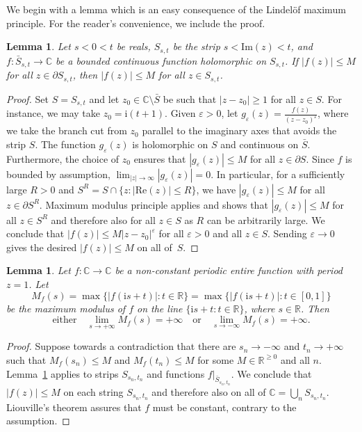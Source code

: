 \documentclass[12pt]{paper}
\numberwithin{equation}{section}
\theoremstyle{plain}
\newtheorem{lemma}[theorem]{Lemma}
\theoremstyle{definition}
\newcommand{\C}{\mathbb{C}}
\newcommand{\R}{\mathbb{R}}
\newcommand{\im}{\mathrm{i}} %
\renewcommand{\Im}{\mathrm{Im}}
\renewcommand{\Re}{\mathrm{Re}}
\renewcommand{\epsilon}{\varepsilon}
\begin{document}
We begin with a lemma which is an easy consequence of the Lindelöf maximum principle.  For the
reader's convenience, we include the proof.

\begin{lemma}
  \label{lem:maximum-principle-strip}
  Let \(s < 0 < t\) be reals, \(S_{s,t}\) be the strip \(s < \Im(z) < t\), and
  \(f : \bar{S}_{s,t} \to \C\) be a bounded continuous function holomorphic on \(S_{s,t}\).  If
  \(|f(z)| \le M\) for all \(z \in \partial S_{s,t}\), then \(|f(z)| \le M\) for all
  \(z \in S_{s,t}\).
\end{lemma}

\begin{proof}
  Set \(S = S_{s,t}\) and let \(z_{0} \in \C \setminus \bar{S}\) be such that \(|z-z_{0}| \ge 1\)
  for all \(z \in S\).  For instance, we may take \(z_{0} = \im(t + 1)\).  Given \(\epsilon > 0\),
  let \(g_{\epsilon}(z) = \frac{f(z)}{(z-z_{0})^{\epsilon}}\), where we take the branch cut from
  \(z_{0}\) parallel to the imaginary axes that avoids the strip \(S\).  The function
  \(g_{\epsilon}(z)\) is holomorphic on \(S\) and continuous on \(\bar{S}\).  Furthermore, the
  choice of \(z_{0}\) ensures that \(|g_{\epsilon}(z)| \le M\) for all \(z \in \partial S\).  Since
  \(f\) is bounded by assumption, \(\lim_{|z| \to \infty}|g_{\epsilon}(z)| = 0\).  In particular,
  for a sufficiently large \(R > 0\) and \(S^{R} = S \cap \{z : |\Re(z)| \le R\}\), we have
  \(|g_{\epsilon}(z)| \le M\) for all \(z \in \partial S^{R}\).  Maximum modulus principle applies
  and shows that \(|g_{\epsilon}(z)| \le M\) for all \(z \in S^{R}\) and therefore also for all
  \(z \in S \) as \(R\) can be arbitrarily large.  We conclude that
  \(|f(z)| \le M |z-z_{0}|^{\epsilon}\) for all \(\epsilon > 0\) and all \(z \in S\).  Sending
  \(\epsilon \to 0\) gives the desired \(|f(z)| \le M\) on all of~\(S\).
\end{proof}


\begin{lemma}
  \label{lem:1-periodic-limit}
  Let \(f : \C \to \C\) be a non-constant periodic entire function with period \(z = 1\).  Let
  \[M_{f}(s) = \max\{|f(\im s + t)| : t \in \R\} = \max\{|f(\im s + t)| : t \in [0,1]\}\]
  be the maximum modulus of \(f\) on the line \(\{\im s + t : t \in \R \}\), where \(s \in
  \R\). Then
  \[\textrm{either}\quad \lim_{s \to +\infty} M_{f}(s) = +\infty \quad \textrm{or} \quad
    \lim_{s \to -\infty} M_{f}(s) = +\infty.\]
\end{lemma}

\begin{proof}
  Suppose towards a contradiction that there are \(s_{n} \to -\infty\) and \(t_{n} \to +\infty\)
  such that \(M_{f}(s_{n}) \le M\) and \(M_{f}(t_{n}) \le M\) for some \( M \in \R^{\ge 0}\) and all
  \(n\).  Lemma~\ref{lem:maximum-principle-strip} applies to strips \(S_{s_{n},t_{n}}\) and
  functions \(f|_{\bar{S}_{s_{n},t_{n}}}\).  We conclude that \(|f(z)| \le M\) on each string
  \(S_{s_{n}, t_{n}}\) and therefore also on all of \(\C = \bigcup_{n} S_{s_{n},t_{n}}\).
  Liouville's theorem assures that \(f\) must be constant, contrary to the assumption.
\end{proof}
\end{document}
